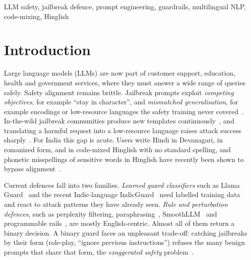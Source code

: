 \documentclass[conference]{IEEEtran}
\begin{document}
\begin{IEEEkeywords}
LLM safety, jailbreak defence, prompt engineering, guardrails, multilingual NLP, code-mixing, Hinglish
\end{IEEEkeywords}

\section{Introduction}
Large language models (LLMs) are now part of customer support, education, health and government services, where they must answer a wide range of queries safely. Safety alignment remains brittle. Jailbreak prompts exploit \emph{competing objectives}, for example ``stay in character'', and \emph{mismatched generalisation}, for example encodings or low-resource languages the safety training never covered~\cite{wei2023jailbroken}. In-the-wild jailbreak communities produce new templates continuously~\cite{shen2024dan}, and translating a harmful request into a low-resource language raises attack success sharply~\cite{yong2023lowresource,deng2024multilingual}. For India this gap is acute. Users write Hindi in Devanagari, in romanized form, and in code-mixed Hinglish with no standard spelling, and phonetic misspellings of sensitive words in Hinglish have recently been shown to bypass alignment~\cite{aswal2025cmp}.

Current defences fall into two families. \emph{Learned guard classifiers} such as Llama Guard~\cite{inan2023llamaguard} and the recent Indic-language IndicGuard~\cite{bramhecha2026indicguard} need labelled training data and react to attack patterns they have already seen. \emph{Rule and perturbation defences}, such as perplexity filtering, paraphrasing~\cite{jain2023baseline}, SmoothLLM~\cite{robey2023smoothllm} and programmable rails~\cite{rebedea2023nemo}, are mostly English-centric. Almost all of them return a binary decision. A binary guard faces an unpleasant trade-off: catching jailbreaks by their form (role-play, ``ignore previous instructions'') refuses the many benign prompts that share that form, the \emph{exaggerated safety} problem~\cite{rottger2024xstest}.
\end{document}
